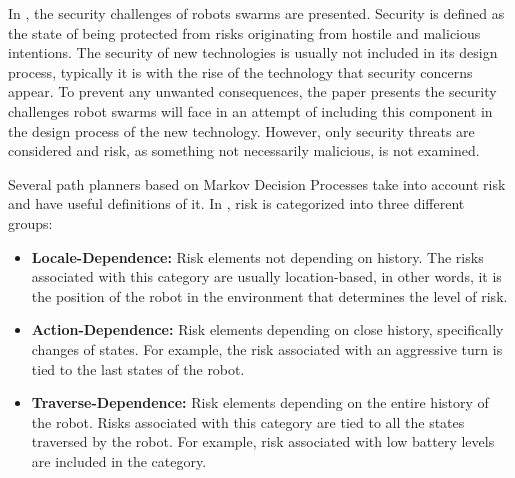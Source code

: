 In \cite{higgins2009threats}, the security challenges of robots swarms are presented. Security is defined as the state of being protected from risks originating from hostile and malicious intentions. The security of new technologies is usually not included in its design process, typically it is with the rise of the technology that security concerns appear. To prevent any unwanted consequences, the paper presents the security challenges robot swarms will face in an attempt of including this component in the design process of the new technology. However, only security threats are considered and risk, as something not necessarily malicious, is not examined.

Several path planners based on Markov Decision Processes \cite{undurti2010online,thiebaux2016rao,xiao2020robot} take into account risk and have useful definitions of it. In \cite{xiao2020robot}, risk is categorized into three different groups:

\begin{itemize}
    \item \textbf{Locale-Dependence:} Risk elements not depending on history. The risks associated with this category are usually location-based, in other words, it is the position of the robot in the environment that determines the level of risk. 
    \item \textbf{Action-Dependence:} Risk elements depending on close history, specifically changes of states. For example, the risk associated with an aggressive turn is tied to the last states of the robot.   
    \item \textbf{Traverse-Dependence:} Risk elements depending on the entire history of the robot. Risks associated with this category are tied to all the states traversed by the robot. For example, risk associated with low battery levels are included in the category.  
\end{itemize}

